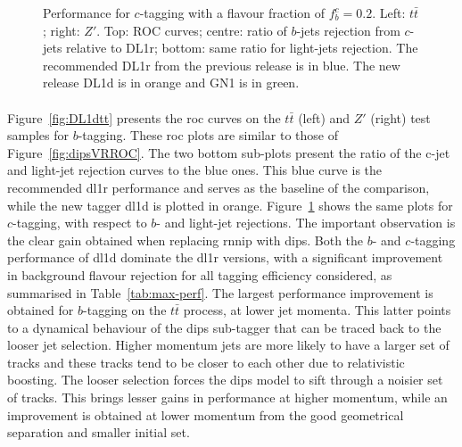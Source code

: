 \begin{figure}[h!]
{  }
  \caption{Performance for $c$-tagging with a flavour fraction of $f^c_b = 0.2$. Left: $t\bar{t}$; right: $Z'$. Top: ROC curves; centre: ratio of $b$-jets rejection from $c$-jets relative to DL1r; bottom: same ratio for light-jets rejection. The recommended DL1r from the previous release is in blue. The new release DL1d is in orange and GN1 is in green.}
  \label{fig:DL1dz}
\end{figure}
\vspace*{\fill}

\clearpage

\paragraph{}Figure~\ref{fig:DL1dtt} presents the \gls{roc} curves on the $t\bar{t}$ (left) and $Z'$ (right) test samples for $b$-tagging. These \gls{roc} plots are similar to those of Figure~\ref{fig:dipsVRROC}. The two bottom sub-plots present the ratio of the c-jet and light-jet rejection curves to the blue ones. This blue curve is the recommended \gls{dl1r} performance and serves as the baseline of the comparison, while the new tagger \gls{dl1d} is plotted in orange. Figure~\ref{fig:DL1dz} shows the same plots for $c$-tagging, with respect to $b$- and light-jet rejections. The important observation is the clear gain obtained when replacing \gls{rnnip} with \gls{dips}. Both the $b$- and $c$-tagging performance of \gls{dl1d} dominate the \gls{dl1r} versions, with a significant improvement in background flavour rejection for all tagging efficiency considered, as summarised in Table~\ref{tab:max-perf}. The largest performance improvement is obtained for $b$-tagging on the $t\bar{t}$ process, at lower jet momenta. This latter points to a dynamical behaviour of the \gls{dips} sub-tagger that can be traced back to the looser jet selection. Higher momentum jets are more likely to have a larger set of tracks and these tracks tend to be closer to each other due to relativistic boosting. The looser selection forces the \gls{dips} model to sift through a noisier set of tracks. This brings lesser gains in performance at higher momentum, while an improvement is obtained at lower momentum from the good geometrical separation and smaller initial set.  \\


